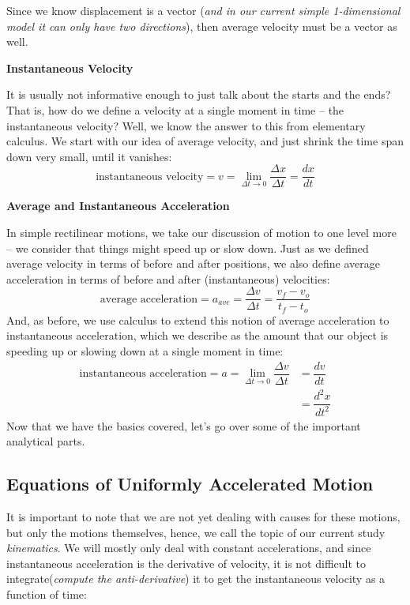 \documentclass[12pt,addpoints]{exam}
\begin{document}
	Since we know displacement is a vector (\textit{and in our current simple 1-dimensional model it can only have two directions}), then average velocity must be a vector as well.
	\begin{center}
		\textbf{Instantaneous Velocity}
	\end{center}
	It is usually not informative enough to just talk about the starts and the ends? That is, how do we define a velocity at a single moment in time – the instantaneous velocity? Well, we know the answer to this from elementary calculus. We start with our idea of average velocity, and just shrink the time span down very small, until it vanishes:
	$$\text{instantaneous velocity} = v = \lim_{\Delta t \rightarrow 0} \dfrac{\Delta x}{\Delta t} = \dfrac{dx}{dt}$$
	\begin{center}
		\textbf{Average and Instantaneous Acceleration}
	\end{center}
	In simple rectilinear motions, we take our discussion of motion to one level more – we consider that things might speed up or slow down. Just as we defined average velocity in terms of before and after positions, we also define average acceleration in terms of before and after (instantaneous) velocities:
	$$\text{average acceleration} = a_{ave} = \dfrac{\Delta v}{\Delta t} = \dfrac{v_f-v_o}{t_f-t_o}$$
	And, as before, we use calculus to extend this notion of average acceleration to instantaneous acceleration, which we describe as the amount that our object is speeding up or slowing down at a single moment in time:
	\begin{align} \text{instantaneous acceleration} = a = \lim_{\Delta t \rightarrow 0} \dfrac{\Delta v}{\Delta t} &= \dfrac{dv}{dt} \\[5pt] &= \dfrac{d^2x}{dt^2}\end{align}
	Now that we have the basics covered, let's go over some of the important analytical parts.
	\begin{center}
		\subsection*{Equations of Uniformly Accelerated Motion}
	\end{center}
	It is important to note that we are not yet dealing with causes for these motions, but only the motions themselves, hence, we call the topic of our current study \textit{kinematics}. We will mostly only deal with constant accelerations, and since instantaneous acceleration is the derivative of velocity, it is not difficult to integrate(\textit{compute the anti-derivative}) it to get the instantaneous velocity as a function of time:
\end{document}
